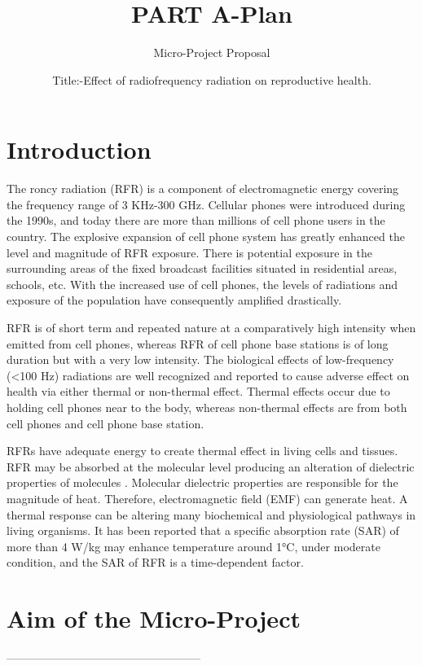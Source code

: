 \documentclass{article}
\title{PART A-Plan}
\author{Micro-Project Proposal}
\date{Title:-Effect of radiofrequency radiation on reproductive health.}
\begin{document}
\maketitle 


\section*{Introduction}%

\large{The roncy radiation (RFR) is a component of electromagnetic energy covering the frequency range of 3 KHz-300 GHz. Cellular phones were introduced during the 1990s, and today there are more than millions of cell phone users in the country. The explosive expansion of cell phone system has greatly enhanced the level and magnitude of RFR exposure. There is potential exposure in the surrounding areas of the fixed broadcast facilities situated in residential areas, schools, etc. With the increased use of cell phones, the levels of radiations and exposure of the population have consequently amplified drastically.


 RFR is of short term and repeated nature at a comparatively high intensity when emitted from cell phones, whereas RFR of cell phone base stations is of long duration but with a very low intensity. The biological effects of low-frequency (<100 Hz) radiations are well recognized and reported to cause adverse effect on health via either thermal or non-thermal effect. Thermal effects occur due to holding cell phones near to the body, whereas non-thermal effects are from both cell phones and cell phone base station.

RFRs have adequate energy to create thermal effect in living cells and tissues. RFR may be absorbed at the molecular level producing an alteration of dielectric properties of molecules . Molecular dielectric properties are responsible for the magnitude of heat. Therefore, electromagnetic field (EMF) can generate heat. A thermal response can be altering many biochemical and physiological pathways in living organisms. It has been reported that a specific absorption rate (SAR) of more than 4 W/kg may enhance temperature around 1°C, under moderate condition, and the SAR of RFR is a time-dependent factor.
}



\section{ Aim of the Micro-Project} %
---------------------------------------------------
\end{document}
